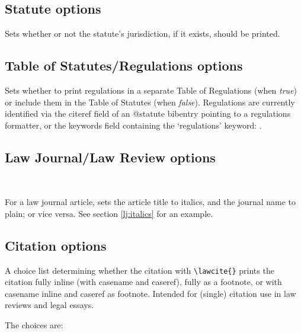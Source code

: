 \subsection{Statute options}


Sets whether or not the statute's jurisdiction, if it exists, should be printed.
\bigskip

\subsection{Table of Statutes/Regulations options}


Sets whether to print regulations in a separate Table of Regulations (when \textit{true}) or include them in the Table of Statutes (when \textit{false}). Regulations are currently identified via the citeref field of an @statute bibentry pointing to a regulations formatter, or the keywords field containing the `regulations' keyword: .
\bigskip



\subsection{Law Journal/Law Review options}

\\

For a law journal article, sets the article title to italics, and the journal name to plain; or vice versa. See section \autoref{lj:italics} for an example.
\bigskip






\subsection{Citation options}


A choice list determining whether the citation with \texttt{\textbackslash lawcite\{\}} prints the citation fully inline (with casename and caseref), fully as a footnote, or with casename inline and caseref as footnote. Intended for (single) citation use in law reviews and legal essays.

The choices are:

